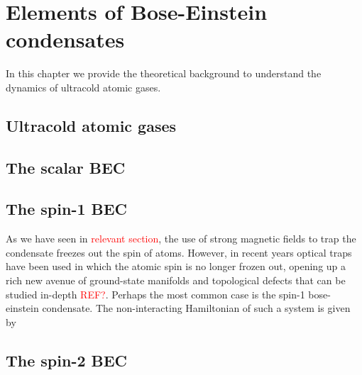 \chapter{Elements of Bose-Einstein condensates}

In this chapter we provide the theoretical background to understand the 
dynamics of ultracold atomic gases.


\section{Ultracold atomic gases}


\section{The scalar BEC}

\section{The spin-1 BEC}
As we have seen in \textcolor{red}{relevant section}, the use of strong 
magnetic fields to trap the condensate freezes out the spin of atoms.
However, in recent years optical traps have been used in which the atomic 
spin is no longer frozen out, opening up a rich new avenue of ground-state
manifolds and topological defects that can be studied in-depth
\textcolor{red}{REF?}.
Perhaps the most common case is the spin-1 bose-einstein condensate.
The non-interacting Hamiltonian of such a system is given by

\section{The spin-2 BEC}
